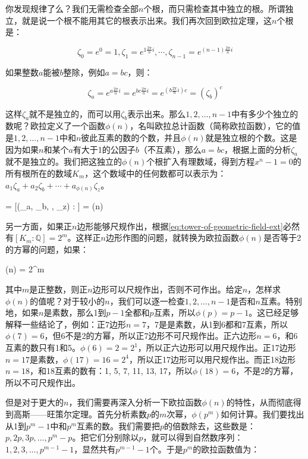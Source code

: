 你发现规律了么？我们无需检查全部$n$个根，而只需检查其中独立的根。所谓独立，就是说一个根不能用其它的根表示出来。我们再次回到欧拉定理，这$n$个根是：

\[
\zeta_0 = e^0 = 1, \zeta_1 = e^{1\frac{2\pi}{n}i}, \dotsb, \zeta_{n-1} = e^{(n - 1)\frac{2\pi}{n}i}
\]

如果整数$a$能被$b$整除，例如$a = bc$，则：

\[
\zeta_a = e^{a\frac{2\pi}{n}i} = e^{bc\frac{2\pi}{n}i} = e^{(b\frac{2\pi}{n}i)c} = (\zeta_b)^c
\]

 
这样$\zeta_a$就不是独立的，而可以用$\zeta_b$表示出来。那么$1, 2, \dotsc, n-1$中有多少个独立的数呢？欧拉定义了一个函数$\phi(n)$，名叫欧拉总计函数（简称欧拉函数），它的值是$1, 2, \dotsc, n-1$中和$n$彼此互素的数的个数，并且$\phi(n)$就是独立根的个数。这是因为如果$n$和某个$a$有大于1的公因子$b$（不互素），那么$a = bc$，根据上面的分析$\zeta_a$就不是独立的。我们把这独立的$\phi(n)$个根扩入有理数域，得到方程$x^n -1 = 0$的所有根所在的数域$K_m$，这个数域中的任何数都可以表示为：$a_1 \zeta_a + a_2\zeta_b + \dotsb + a_{\phi(n)}\zeta_z$。

\be
[K_m : \mathbb{Q}] = [(\zeta_a, \zeta_b, \dotsc, \zeta_z) : ] = \phi(n)
\ee

另一方面，如果正$n$边形能够尺规作出，根据\cref{eq:tower-of-geometric-field-ext}必然有$[K_m : \mathbb{Q}] = 2^m$。这样正$n$边形作图的问题，就转换为欧拉函数$\phi(n)$是否等于2的方幂的问题，如果：

\be
\phi(n) = 2^m
\label{eq:euler-function-as-power-of-2}
\ee

其中$m$是正整数，则正$n$边形可以尺规作出，否则不可作出。给定$n$，怎样求$\phi(n)$的值呢？对于较小的$n$，我们可以逐一检查$1, 2, \dotsc, n - 1$是否和$n$互素。特别地，如果$n$是素数，那么1到$p-1$全都和$p$互素，所以$\phi(p) = p - 1$。这已经足够解释一些结论了，例如：正7边形$n = 7$，7是是素数，从1到6都和7互素，所以$\phi(7) = 6$，但6不是2的方幂，所以正7边形不可尺规作出。正六边形$n = 6$，和6互素的数只有1和5。$\phi(6) = 2 = 2^1$，所以正六边形可以用尺规作出。正17边形$n = 17$是素数，$\phi(17) = 16 = 2^4$，所以正17边形可以用尺规作出。而正18边形$n = 18$，和18互素的数有：1, 5, 7, 11, 13, 17，所以$\phi(18) = 6$，不是2的方幂，所以不可尺规作出。

但是对于更大的$n$，我们需要再深入分析一下欧拉函数$\phi(n)$的特性，从而彻底得到高斯——旺策尔定理。首先分析素数$p$的$m$次幂，$\phi(p^m)$如何计算。我们要找出从1到$p^m-1$中和$p^m$互素的数。我们需要把$p$的倍数除去，这些数是：$p, 2p, 3p, \dotsc, p^m - p$。把它们分别除以$p$，就可以得到自然数序列：$1, 2, 3, ..., p^{m-1} - 1$，显然共有$p^{m-1} - 1$个。于是$p^m$的欧拉函数值为：


